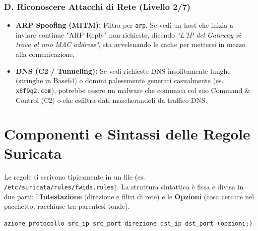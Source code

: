 \documentclass[12pt,a4paper]{report}
\begin{document}
	\subsubsection{D. Riconoscere Attacchi di Rete (Livello 2/7)}
	\begin{itemize}
		\item \textbf{ARP Spoofing (MITM):} Filtra per \texttt{arp}. Se vedi un host che inizia a inviare continue "ARP Reply" non richieste, dicendo \textit{"L'IP del Gateway si trova al mio MAC address"}, sta avvelenando le cache per mettersi in mezzo alla comunicazione.
		\item \textbf{DNS (C2 / Tunneling):} Se vedi richieste DNS insolitamente lunghe (stringhe in Base64) o domini palesemente generati casualmente (es. \texttt{x8f9q2.com}), potrebbe essere un malware che comunica col suo Command \& Control (C2) o che esfiltra dati mascherandoli da traffico DNS.
	\end{itemize}
	
	\section{Componenti e Sintassi delle Regole Suricata}
	Le regole si scrivono tipicamente in un file (es. \texttt{/etc/suricata/rules/fwids.rules}). La struttura sintattica è fissa e divisa in due parti: l'\textbf{Intestazione} (direzione e filtri di rete) e le \textbf{Opzioni} (cosa cercare nel pacchetto, racchiuse tra parentesi tonde).
	
	\vspace{0.3cm}
	\texttt{azione protocollo src\_ip src\_port direzione dst\_ip dst\_port (opzioni;)}
	\vspace{0.3cm}
	
\end{document}
